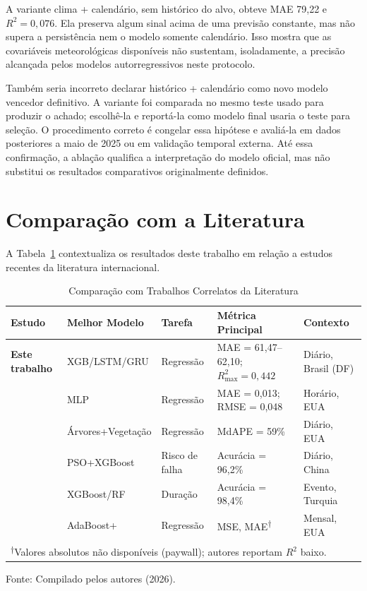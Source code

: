 A variante clima + calendário, sem histórico do alvo, obteve MAE 79,22 e $R^2=0{,}076$. Ela preserva algum sinal acima de uma previsão constante, mas não supera a persistência nem o modelo somente calendário. Isso mostra que as covariáveis meteorológicas disponíveis não sustentam, isoladamente, a precisão alcançada pelos modelos autorregressivos neste protocolo.

Também seria incorreto declarar histórico + calendário como novo modelo vencedor definitivo. A variante foi comparada no mesmo teste usado para produzir o achado; escolhê-la e reportá-la como modelo final usaria o teste para seleção. O procedimento correto é congelar essa hipótese e avaliá-la em dados posteriores a maio de 2025 ou em validação temporal externa. Até essa confirmação, a ablação qualifica a interpretação do modelo oficial, mas não substitui os resultados comparativos originalmente definidos.


\section{Comparação com a Literatura}

A Tabela~\ref{tab:comparacao_literatura} contextualiza os resultados deste trabalho em relação a estudos recentes da literatura internacional.

\begin{table}[H]
\caption{Comparação com Trabalhos Correlatos da Literatura}
\label{tab:comparacao_literatura}
\begin{center}
\footnotesize
\begin{tabularx}{\textwidth}{l l l X l}
\toprule
\textbf{Estudo} & \textbf{Melhor Modelo} & \textbf{Tarefa} & \textbf{Métrica Principal} & \textbf{Contexto} \\
\midrule
\textbf{Este trabalho} & XGB/LSTM/GRU & Regressão & MAE = 61,47--62,10; $R^2_{\max}=0{,}442$ & Diário, Brasil (DF) \\
\cite{zhang2023deep} & MLP & Regressão & MAE = 0,013; RMSE = 0,048 & Horário, EUA \\
\cite{smith2021hybrid} & Árvores+Vegetação & Regressão & MdAPE = 59\% & Diário, EUA \\
\cite{saha2019machine} & PSO+XGBoost & Risco de falha & Acurácia = 96,2\% & Diário, China \\
\cite{silva2021xgboost} & XGBoost/RF & Duração & Acurácia = 98,4\% & Evento, Turquia \\
\cite{roque2017weather} & AdaBoost+ & Regressão & MSE, MAE\textsuperscript{$\dagger$} & Mensal, EUA \\
\bottomrule
\multicolumn{5}{l}{\textsuperscript{$\dagger$}\scriptsize{Valores absolutos não disponíveis (paywall); autores reportam $R^2$ baixo.}} \\
\end{tabularx}
\normalsize
\end{center}
\small{Fonte: Compilado pelos autores (2026).}
\end{table}

